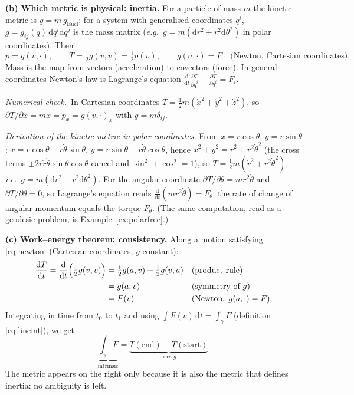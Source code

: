 \documentclass[11pt,a4paper]{article}
\numberwithin{equation}{section}
\theoremstyle{definition}
\theoremstyle{plain}
\newcommand{\numcheck}{\textit{Numerical check.}\ }
\newcommand{\dd}{\mathrm{d}}
\newcommand{\ie}{\emph{i.e.}\ }
\newcommand{\eg}{\emph{e.g.}\ }
\begin{document}
\textbf{(b) Which metric is physical: inertia.} For a particle of mass $m$ the kinetic metric is $g=m\,g_{\mathrm{Eucl}}$; for a system with generalised coordinates $q^i$, $g=g_{ij}(q)\,\dd q^i\dd q^j$ is the mass matrix (\eg $g=m(\dd r^2+r^2\dd\theta^2)$ in polar coordinates). Then
\begin{equation}\label{eq:newton}
p=g(v,\cdot),\qquad T=\tfrac12g(v,v)=\tfrac12p(v),\qquad g(a,\cdot)=F\quad\text{(Newton, Cartesian coordinates).}
\end{equation}
Mass is the map from vectors (acceleration) to covectors (force). In general coordinates Newton's law is Lagrange's equation $\frac{\dd}{\dd t}\frac{\partial T}{\partial\dot q^i}-\frac{\partial T}{\partial q^i}=F_i$.

\numcheck In Cartesian coordinates $T=\frac12m(\dot x^2+\dot y^2+\dot z^2)$, so $\partial T/\partial\dot x=m\dot x=p_x=g(v,\cdot)_x$ with $g=m\delta_{ij}$.

\emph{Derivation of the kinetic metric in polar coordinates.} From $x=r\cos\theta$, $y=r\sin\theta$: $\dot x=\dot r\cos\theta-r\dot\theta\sin\theta$, $\dot y=\dot r\sin\theta+r\dot\theta\cos\theta$, hence $\dot x^2+\dot y^2=\dot r^2+r^2\dot\theta^2$ (the cross terms $\pm2r\dot r\dot\theta\sin\theta\cos\theta$ cancel and $\sin^2+\cos^2=1$), so $T=\frac12m(\dot r^2+r^2\dot\theta^2)$, \ie $g=m(\dd r^2+r^2\dd\theta^2)$. For the angular coordinate $\partial T/\partial\dot\theta=mr^2\dot\theta$ and $\partial T/\partial\theta=0$, so Lagrange's equation reads $\frac{\dd}{\dd t}(mr^2\dot\theta)=F_\theta$: the rate of change of angular momentum equals the torque $F_\theta$.
(The same computation, read as a geodesic problem, is Example~\ref{ex:polarfree}.)

\textbf{(c) Work--energy theorem: consistency.} Along a motion satisfying \eqref{eq:newton} (Cartesian coordinates, $g$ constant):
\begin{align*}
\frac{\dd T}{\dd t}=\frac{\dd}{\dd t}\Bigl(\tfrac12g(v,v)\Bigr)&=\tfrac12g(a,v)+\tfrac12g(v,a) &&\text{(product rule)}\\
&=g(a,v) &&\text{(symmetry of $g$)}\\
&=F(v) &&\text{(Newton: $g(a,\cdot)=F$).}
\end{align*}
Integrating in time from $t_0$ to $t_1$ and using $\int F(v)\,\dd t=\int_\gamma F$ (definition \eqref{eq:lineint}), we get
\[
\underbrace{\int_\gamma F}_{\text{intrinsic}}=\underbrace{T(\text{end})-T(\text{start})}_{\text{uses }g}.
\]
The metric appears on the right only because it is also the metric that defines inertia: no ambiguity is left.
\end{document}
